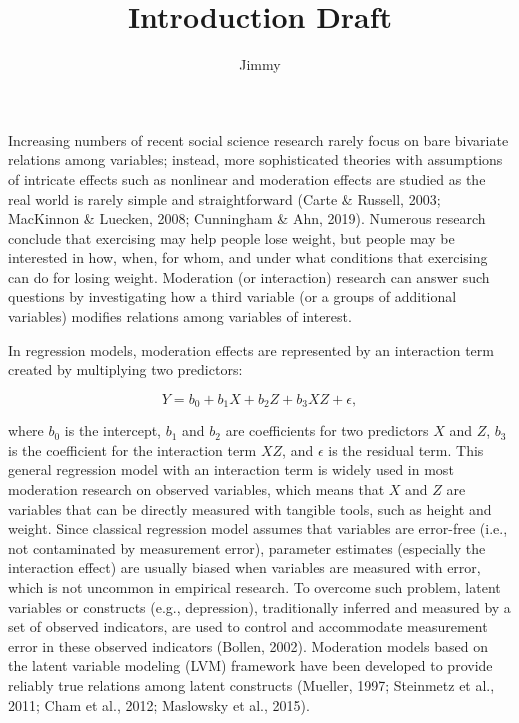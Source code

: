 \documentclass[
  man]{apa7}
\title{Introduction Draft}
\author{Jimmy\textsuperscript{}}
\date{}
\affiliation{\phantom{0}}
\begin{document}
\maketitle

Increasing numbers of recent social science research rarely focus on bare bivariate relations among variables; instead, more sophisticated theories with assumptions of intricate effects such as nonlinear and moderation effects are studied as the real world is rarely simple and straightforward (Carte \& Russell, 2003; MacKinnon \& Luecken, 2008; Cunningham \& Ahn, 2019). Numerous research conclude that exercising may help people lose weight, but people may be interested in how, when, for whom, and under what conditions that exercising can do for losing weight. Moderation (or interaction) research can answer such questions by investigating how a third variable (or a groups of additional variables) modifies relations among variables of interest.

In regression models, moderation effects are represented by an interaction term created by multiplying two predictors:

\begin{equation}
Y = b_{0} + b_{1}X + b_{2}Z + b_{3}XZ + \epsilon,
\end{equation}

where \(b_{0}\) is the intercept, \(b_{1}\) and \(b_{2}\) are coefficients for two predictors \(X\) and \(Z\), \(b_{3}\) is the coefficient for the interaction term \(XZ\), and \(\epsilon\) is the residual term. This general regression model with an interaction term is widely used in most moderation research on observed variables, which means that \(X\) and \(Z\) are variables that can be directly measured with tangible tools, such as height and weight. Since classical regression model assumes that variables are error-free (i.e., not contaminated by measurement error), parameter estimates (especially the interaction effect) are usually biased when variables are measured with error, which is not uncommon in empirical research. To overcome such problem, latent variables or constructs (e.g., depression), traditionally inferred and measured by a set of observed indicators, are used to control and accommodate measurement error in these observed indicators (Bollen, 2002). Moderation models based on the latent variable modeling (LVM) framework have been developed to provide reliably true relations among latent constructs (Mueller, 1997; Steinmetz et al., 2011; Cham et al., 2012; Maslowsky et al., 2015).
\end{document}

